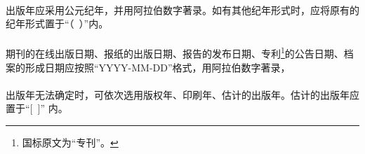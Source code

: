 \documentclass[twoside]{article}%
\begin{document}
\paragraph{}\label{sec:pub:pubdate} 出版年应采用公元纪年，并用阿拉伯数字著录。如有其他纪年形式时，应将原有的纪年形式置于“（~）”内。\label{sec:pub:date}

\begin{refsection}
\nocite{egbookpubdatea--}
\nocite{egbookpubdateb--}

{}
\end{refsection}


\paragraph{} 期刊的在线出版日期、报纸的出版日期、报告的发布日期、专利\footnote{国标原文为“专刊”。}的公告日期、档案的形成日期应按照“YYYY-MM-DD”格式，用阿拉伯数字著录，


\begin{refsection}
\nocite{egbookpubdatec--}

{}
\end{refsection}

%
%

\paragraph{}\label{sec:pub:date-estimated} 出版年无法确定时，可依次选用版权年、印刷年、估计的出版年。估计的出版年应置于“[~]”
内。

\begin{refsection}

\nocite{egbookpubdated--}
\nocite{egbookpubdatee--}
\nocite{egbookpubdatef--}

{}
\end{refsection}
\end{document}
